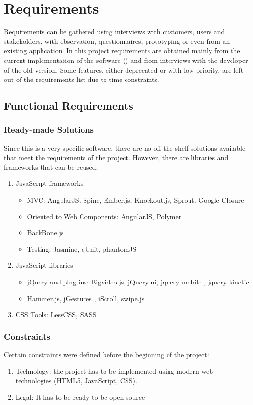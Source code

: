 \chapter{Requirements}
Requirements can be gathered using interviews with customers, users and stakeholders, with observation, questionnaires, prototyping or even from an existing application.
In this project requirements are obtained mainly from the current implementation of the software () and from interviews with the developer of the old version.
Some features, either deprecated or with low priority, are left out of the requirements list due to time constraints. 

\section{Functional Requirements}

\subsection*{Ready-made Solutions}
Since this is a very specific software, there are no off-the-shelf solutions available that meet the requirements of the project.
However, there are libraries and frameworks that can be reused:

\begin{enumerate}
    \item JavaScript frameworks
    \begin{itemize}
        \item \ac{MVC}: AngularJS, Spine, Ember.js, Knockout.js, Sprout, Google Closure
        \item Oriented to Web Components: AngularJS, Polymer
        \item BackBone.js
    \item Testing: Jasmine, qUnit, phantomJS   
    \end{itemize}
    \item JavaScript libraries
    \begin{itemize}
        \item jQuery and plug-ins: Bigvideo.js, jQuery-ui, jquery-mobile , jquery-kinetic  
        \item Hammer.js, jGestures , iScroll, swipe.js
    \end{itemize} 
    \item \ac{CSS} Tools: LessCSS, SASS
\end{enumerate}

\subsection*{Constraints}
Certain constraints were defined before the beginning of the project:
\begin{enumerate}
    \item Technology: the project has to be implemented using modern web technologies (\ac{HTML5}, JavaScript, \ac{CSS}).
    \item Legal: It has to be ready to be open source
\end{enumerate}

